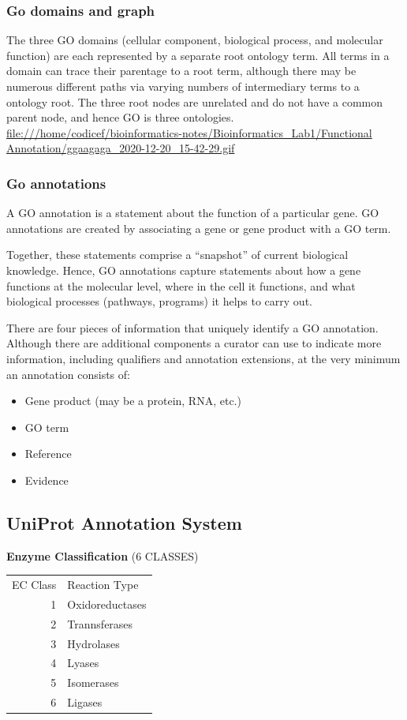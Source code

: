 \documentclass[11pt]{article}
\begin{document}
\subsubsection{Go domains and graph}
\label{sec:org9cd3ae9}
The three GO domains (cellular component, biological process, and molecular function) are each
 represented by a separate root ontology term. All terms in a domain can trace their parentage
 to a root term, although there may be numerous different paths via varying numbers of
 intermediary terms to a ontology root. The three root nodes are unrelated and do not have a
 common parent node, and hence GO is three ontologies.
\url{file:///home/codicef/bioinformatics-notes/Bioinformatics\_Lab1/Functional Annotation/ggaagaga\_2020-12-20\_15-42-29.gif}

\subsubsection{Go annotations}
\label{sec:orgcf542d0}
A GO annotation is a statement about the function of a particular gene. GO annotations are
created by associating a gene or gene product with a GO term.

Together, these statements comprise a “snapshot” of current biological knowledge. Hence, GO
annotations capture statements about how a gene functions at the molecular level, where in the
cell it functions, and what biological processes (pathways, programs) it helps to carry out.

There are four pieces of information that uniquely identify a GO annotation. Although there
are additional components a curator can use to indicate more information, including qualifiers
and annotation extensions, at the very minimum an annotation consists of:

\begin{itemize}
\item Gene product (may be a protein, RNA, etc.)
\item GO term
\item Reference
\item Evidence
\end{itemize}


\subsection{UniProt Annotation System}
\label{sec:org1d595bb}

\textbf{Enzyme Classification} (6 CLASSES)
\begin{center}
\begin{tabular}{rl}
EC Class & Reaction Type\\
1 & Oxidoreductases\\
2 & Trannsferases\\
3 & Hydrolases\\
4 & Lyases\\
5 & Isomerases\\
6 & Ligases\\
\end{tabular}
\end{center}
\end{document}
